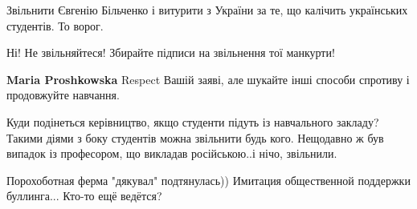  
Звільнити Євгенію Більченко і витурити з України за те, що калічить українських студентів. То ворог.

 
Ні! Не звільняйтеся! Збирайте підписи на звільнення тої манкурти!

 
\textbf{Maria Proshkowska}
Respect Вашій заяві, але шукайте інші способи спротиву і продовжуйте навчання.

 

Куди подінеться керівництво, якщо студенти підуть із навчального закладу?
Такими діями з боку студентів можна звільнити будь кого. Нещодавно ж був
випадок із професором, що викладав російською..і нічо, звільнили.

 

Порохоботная ферма "дякувал" подтянулась))
Имитация общественной поддержки буллинга...
Кто-то ещё ведётся?

